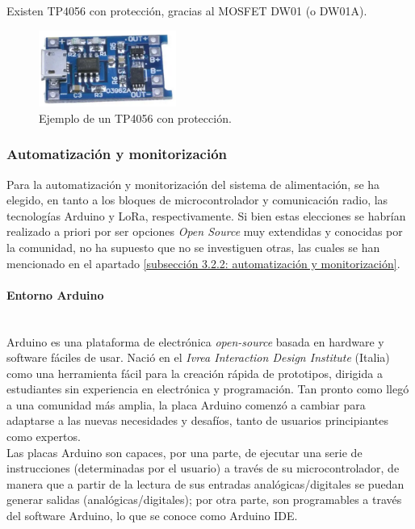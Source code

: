 \documentclass[12pt]{article}
\newcommand{\subsubsubsection}[1]{\paragraph{#1}\mbox{}\\}
\begin{document}
	\noindent Existen TP4056 con protección, gracias al MOSFET DW01 (o DW01A). \\
	
	\begin{figure}[h]
		\begin{center}
			\includegraphics[width=0.4\textwidth]{img/tp4056_withProtection.png}
			\caption{Ejemplo de un TP4056 con protección.}
			\label{TP4056 con protección}
		\end{center}
	\end{figure}
	

	\subsubsection{Automatización y monitorización}
	
	\noindent Para la automatización y monitorización del sistema de alimentación, se ha elegido, en tanto a los bloques de microcontrolador y  comunicación radio, las tecnologías Arduino y LoRa, respectivamente. Si bien estas elecciones se habrían realizado a priori por ser opciones \textit{Open Source} muy extendidas y conocidas por la comunidad, no ha supuesto que no se investiguen otras, las cuales se han mencionado en el apartado \ref{subsección 3.2.2: automatización y monitorización}.
	
	\subsubsubsection{Entorno Arduino}
	
	
	\noindent Arduino es una plataforma de electrónica \textit{open-source} basada en hardware y software fáciles de usar. Nació en el \textit{Ivrea Interaction Design Institute} (Italia) como una herramienta fácil para la creación rápida de prototipos, dirigida a estudiantes sin experiencia en electrónica y programación. Tan pronto como llegó a una comunidad más amplia, la placa Arduino comenzó a cambiar para adaptarse a las nuevas necesidades y desafíos, tanto de usuarios principiantes como expertos. \\
	
	\noindent Las placas Arduino son capaces, por una parte, de ejecutar una serie de instrucciones (determinadas por el usuario) a través de su microcontrolador, de manera que a partir de la lectura de sus entradas analógicas/digitales se puedan generar salidas (analógicas/digitales); por otra parte, son programables a través del software Arduino, lo que se conoce como Arduino IDE. \\
	
\end{document}

